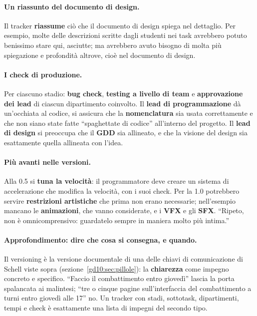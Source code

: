 \paragraph{Un riassunto del documento di design.} Il tracker \textbf{riassume}
ciò che il documento di design spiega nel dettaglio. Per esempio, molte delle
descrizioni scritte dagli studenti nei task avrebbero potuto benissimo stare
qui, asciutte; ma avrebbero avuto bisogno di molta più spiegazione e
profondità altrove, cioè nel documento di design.

\paragraph{I check di produzione.} Per ciascuno stadio: \textbf{bug check},
\textbf{testing a livello di team} e \textbf{approvazione dei lead} di
ciascun dipartimento coinvolto. Il \textbf{lead di programmazione} dà
un'occhiata al codice, si assicura che la \textbf{nomenclatura} sia usata
correttamente e che non siano state fatte ``spaghettate di codice''
all'interno del progetto. Il \textbf{lead di design} si preoccupa che il
\textbf{GDD} sia allineato, e che la visione del design sia esattamente
quella allineata con l'idea.

\paragraph{Più avanti nelle versioni.} Alla 0.5 si \textbf{tuna la
velocità}: il programmatore deve creare un sistema di accelerazione che
modifica la velocità, con i suoi check. Per la 1.0 potrebbero servire
\textbf{restrizioni artistiche} che prima non erano necessarie; nell'esempio
mancano le \textbf{animazioni}, che vanno considerate, e i \textbf{VFX} e gli
\textbf{SFX}. ``Ripeto, non è omnicomprensivo: guardatelo sempre in maniera
molto più intima.''

\paragraph{Approfondimento: dire che cosa si consegna, e quando.} Il
versioning è la versione documentale di una delle chiavi di comunicazione di
Schell viste sopra (sezione~\ref{gd10:sec:pillole}): la \textbf{chiarezza}
come impegno concreto e specifico. ``Faccio il combattimento entro giovedì''
lascia la porta spalancata ai malintesi; ``tre o cinque pagine
sull'interfaccia del combattimento a turni entro giovedì alle 17'' no. Un
tracker con stadi, sottotask, dipartimenti, tempi e check è esattamente una
lista di impegni del secondo tipo.

